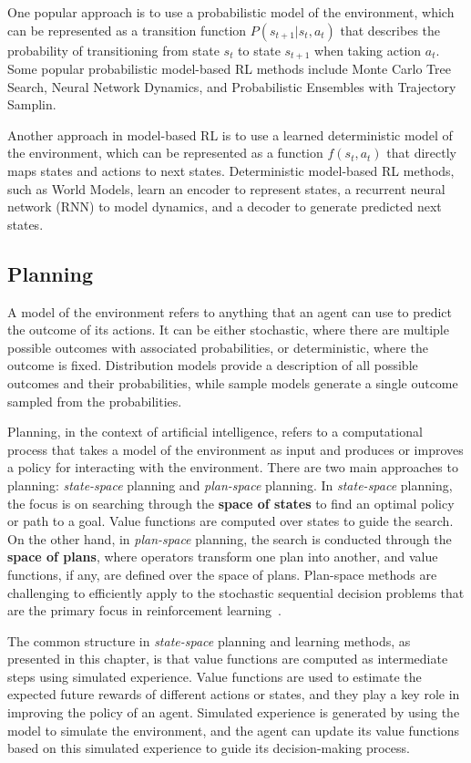 \documentclass[../xlapes02]{subfiles}
\begin{document}
    One popular approach is to use a probabilistic model of the environment, which can be represented as a transition function $P(s_{t+1}|s_t, a_t)$ that describes the probability of transitioning from state $s_t$ to state $s_{t+1}$ when taking action $a_t$. Some popular probabilistic model-based RL methods include Monte Carlo Tree Search, Neural Network Dynamics, and Probabilistic Ensembles with Trajectory Samplin.

    Another approach in model-based RL is to use a learned deterministic model of the environment, which can be represented as a function $f(s_t, a_t)$ that directly maps states and actions to next states. Deterministic model-based RL methods, such as World Models, learn an encoder to represent states, a recurrent neural network (RNN) to model dynamics, and a decoder to generate predicted next states.

    \subsection{Planning}\label{subsec:planning}
    A model of the environment refers to anything that an agent can use to predict the outcome of its actions. It can be either stochastic, where there are multiple possible outcomes with associated probabilities, or deterministic, where the outcome is fixed. Distribution models provide a description of all possible outcomes and their probabilities, while sample models generate a single outcome sampled from the probabilities.

    Planning, in the context of artificial intelligence, refers to a computational process that takes a model of the environment as input and produces or improves a policy for interacting with the environment. There are two main approaches to planning: \emph{state-space} planning and \emph{plan-space} planning. In \emph{state-space} planning, the focus is on searching through the \textbf{space of states} to find an optimal policy or path to a goal. Value functions are computed over states to guide the search. On the other hand, in \emph{plan-space} planning, the search is conducted through the \textbf{space of plans}, where operators transform one plan into another, and value functions, if any, are defined over the space of plans. Plan-space methods are challenging to efficiently apply to the stochastic sequential decision problems that are the primary focus in reinforcement learning~\cite{sutton2018reinforcement}.

    The common structure in \emph{state-space} planning and learning methods, as presented in this chapter, is that value functions are computed as intermediate steps using simulated experience. Value functions are used to estimate the expected future rewards of different actions or states, and they play a key role in improving the policy of an agent. Simulated experience is generated by using the model to simulate the environment, and the agent can update its value functions based on this simulated experience to guide its decision-making process.
\end{document}
